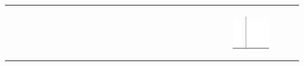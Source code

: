 \documentclass[10pt]{article}
\begin{document}
\begin{center}
\begin{tabular}{|c|c|c|c|c|c|c|c|c|c|c|c|c|c|c|c|c|c|c|c|c|c|c|c|c|c|c|c|c|c|}
 &  &  &  &  &  &  &  &  &  &  &  &  &  &  &  &  &  &  &  &  &  &  &  &  &  &  &  &  &  \\
\hline
 &  &  &  &  &  &  &  &  &  &  &  &  &  &  &  &  &  &  &  &  &  &  &  &  &  &  &  &  &  \\
\hline
 &  &  &  &  &  &  &  &  &  &  &  &  &  &  &  &  &  &  &  &  &  &  &  &  &  &  &  &  &  \\
\hline
 &  &  &  &  &  &  &  &  &  &  &  &  &  &  &  &  &  &  &  &  &  &  &  &  &  &  &  &  &  \\
\hline
 &  &  &  &  &  &  &  &  &  &  &  &  &  &  &  &  &  &  &  &  &  &  &  &  &  & \includegraphics[max width=\textwidth]{2024_11_21_f1ecc00f5c4ab21f0d04g-08}
 &  &  &  \\
\hline
 &  &  &  &  &  &  &  &  &  &  &  &  &  &  &  &  &  &  &  &  &  &  &  &  &  &  &  &  &  \\
\hline
 &  &  &  &  &  &  &  &  &  &  &  &  &  &  &  &  &  &  &  &  &  &  &  &  &  &  &  &  &  \\
\hline
\end{tabular}
\end{center}
\end{document}
